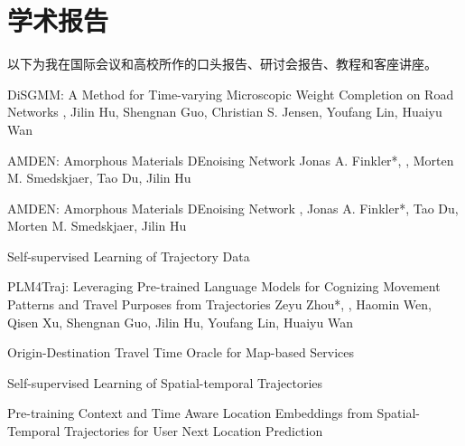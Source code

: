 \label{sec:presentations}
\section*{学术报告}
以下为我在国际会议和高校所作的口头报告、研讨会报告、教程和客座讲座。

{DiSGMM: A Method for Time-varying Microscopic Weight Completion on Road Networks}
{\me, Jilin Hu, Shengnan Guo, Christian S. Jensen, Youfang Lin, Huaiyu Wan}{}

{AMDEN: Amorphous Materials DEnoising Network}
{Jonas A. Finkler*, \me*, Morten M. Smedskjaer, Tao Du, Jilin Hu}{}

{AMDEN: Amorphous Materials DEnoising Network}
{\me*, Jonas A. Finkler*, Tao Du, Morten M. Smedskjaer, Jilin Hu}{}

{Self-supervised Learning of Trajectory Data}
{}{}

{PLM4Traj: Leveraging Pre-trained Language Models for Cognizing Movement Patterns and Travel Purposes from Trajectories}
{Zeyu Zhou*, \me*, Haomin Wen, Qisen Xu, Shengnan Guo, Jilin Hu, Youfang Lin, Huaiyu Wan}{}

{Origin-Destination Travel Time Oracle for Map-based Services}
{}{}

{Self-supervised Learning of Spatial-temporal Trajectories}
{}{}

{Pre-training Context and Time Aware Location Embeddings from Spatial-Temporal Trajectories for User Next Location Prediction}
{}{}
